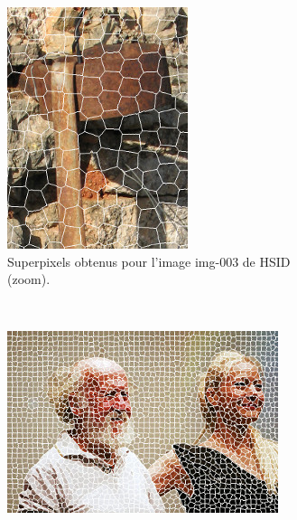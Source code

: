 \begin{figure}[htb]
\begin{subfigure}[t]{0.45\textwidth}
			\includegraphics[width=\textwidth]{images/sur-segmentation/CRS/EX1-img-003-ext1}
		 	\caption{Superpixels obtenus pour l'image img-003 de HSID (zoom).}
	\end{subfigure}
 \\
	 \begin{subfigure}[t]{0.45\textwidth}	
			\includegraphics[width=\textwidth]{images/sur-segmentation/CRS/EX2-img-095}

\end{subfigure}
\end{figure}
